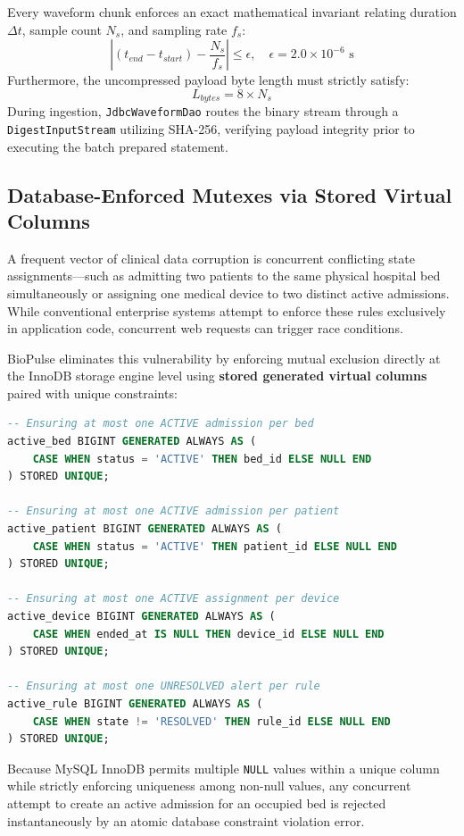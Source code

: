 \documentclass[10pt,journal,compsoc]{IEEEtran}
\begin{document}
Every waveform chunk enforces an exact mathematical invariant relating duration $\Delta t$, sample count $N_s$, and sampling rate $f_s$:
\begin{equation}
\left| (t_{end} - t_{start}) - \frac{N_s}{f_s} \right| \le \epsilon, \quad \epsilon = 2.0 \times 10^{-6}\text{ s}
\end{equation}
Furthermore, the uncompressed payload byte length must strictly satisfy:
\begin{equation}
L_{bytes} = 8 \times N_s
\end{equation}
During ingestion, \texttt{JdbcWaveformDao} routes the binary stream through a \texttt{DigestInputStream} utilizing SHA-256, verifying payload integrity prior to executing the batch prepared statement.

\subsection{Database-Enforced Mutexes via Stored Virtual Columns}
A frequent vector of clinical data corruption is concurrent conflicting state assignments—such as admitting two patients to the same physical hospital bed simultaneously or assigning one medical device to two distinct active admissions. While conventional enterprise systems attempt to enforce these rules exclusively in application code, concurrent web requests can trigger race conditions.

BioPulse eliminates this vulnerability by enforcing mutual exclusion directly at the InnoDB storage engine level using \textbf{stored generated virtual columns} paired with unique constraints:
\begin{lstlisting}[language=SQL]
-- Ensuring at most one ACTIVE admission per bed
active_bed BIGINT GENERATED ALWAYS AS (
    CASE WHEN status = 'ACTIVE' THEN bed_id ELSE NULL END
) STORED UNIQUE;

-- Ensuring at most one ACTIVE admission per patient
active_patient BIGINT GENERATED ALWAYS AS (
    CASE WHEN status = 'ACTIVE' THEN patient_id ELSE NULL END
) STORED UNIQUE;

-- Ensuring at most one ACTIVE assignment per device
active_device BIGINT GENERATED ALWAYS AS (
    CASE WHEN ended_at IS NULL THEN device_id ELSE NULL END
) STORED UNIQUE;

-- Ensuring at most one UNRESOLVED alert per rule
active_rule BIGINT GENERATED ALWAYS AS (
    CASE WHEN state != 'RESOLVED' THEN rule_id ELSE NULL END
) STORED UNIQUE;
\end{lstlisting}
Because MySQL InnoDB permits multiple \texttt{NULL} values within a unique column while strictly enforcing uniqueness among non-null values, any concurrent attempt to create an active admission for an occupied bed is rejected instantaneously by an atomic database constraint violation error.
\end{document}
